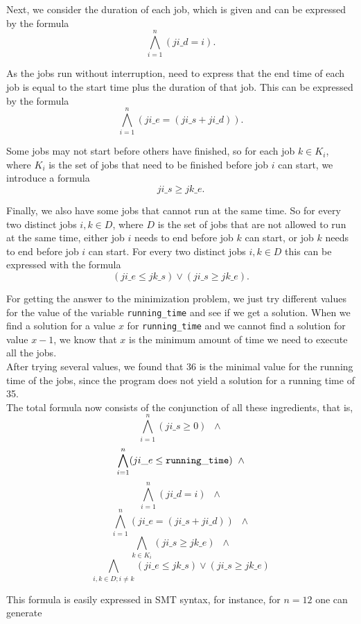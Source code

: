 \documentclass[a4paper]{article}
\begin{document}
	Next, we consider the duration of each job, which is given and can be expressed by the formula
\[ \bigwedge_{i=1}^n (ji\_d = i).\]

	As the jobs run without interruption, need to express that the end time of each job is equal to the start time plus the duration of that job. This can be expressed by the formula
\[ \bigwedge_{i=1}^n (ji\_e = (ji\_s + ji\_d)).\]

	Some jobs may not start before others have finished, so for each job $k \in K_i$, where $K_i$ is the set of jobs that need to be finished before job $i$ can start, we introduce a formula
\[ ji\_s \geq jk\_e.\]

	Finally, we also have some jobs that cannot run at the same time. So for every two distinct jobs $i,k \in D$, where $D$ is the set of jobs that are not allowed to run at the same time, either job $i$ needs to end before job $k$ can start, or job $k$ needs to end before job $i$ can start. For every two distinct jobs $i,k \in D$ this can be expressed with the formula
\[ (ji\_e \leq jk\_s) \vee (ji\_s \geq jk\_e).\]
	
For getting the answer to the minimization problem, we just try different values for the value of the variable {\tt running\_time} and see if we get a solution. When we find a solution for a value $x$ for {\tt running\_time} and we cannot find a solution for value $x-1$, we know that $x$ is the minimum amount of time we need to execute all the jobs.\\

After trying several values, we found that 36 is the minimal value for the running time of the jobs, since the program does not yield a solution for a running time of 35.\\

The total formula now consists of the conjunction of all these ingredients, that is,
\[ \bigwedge_{i=1}^n (ji\_s \geq 0) \;\; \wedge \]
\[ \bigwedge_{i=1}^n (ji\_e \leq {\tt running\_time}) \;\; \wedge \]
\[ \bigwedge_{i=1}^n (ji\_d = i) \;\; \wedge \]
\[ \bigwedge_{i=1}^n (ji\_e = (ji\_s + ji\_d)) \;\; \wedge \]
\[ \bigwedge_{k \in K_i} (ji\_s \geq jk\_e) \;\; \wedge \]
\[ \bigwedge_{i,k \in D; i \neq k} (ji\_e \leq jk\_s) \vee (ji\_s \geq jk\_e) \]


This formula is easily expressed in SMT syntax, for instance, for $n=12$ one can generate
\end{document}
